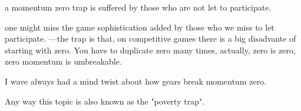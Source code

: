 a momentum zero trap is suffered by those who are not let to participate. 

one might miss the game sophistication added by those who we miss to let participate. 
---the trap is that, on competitive games there is a  big disadvante of starting with zero. 
You have to duplicate zero many times, actually, zero is zero, zero momentum is umbreakable. 

I wave always had a mind twist about how gears break momentum zero. 

Any way this topic is also known as the "poverty trap". 
